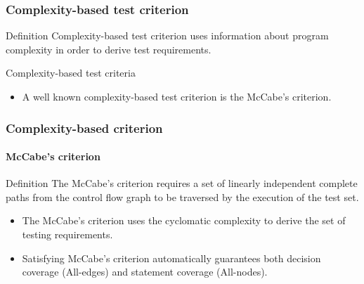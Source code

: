\begin{frame}[parent={cmap:structural-software-testing},hasnext=true,hasprev=true]
\frametitle{Complexity-based test criterion}
\label{concept:complexity-based-test-criterion}

\begin{block:concept}{Definition}
Complexity-based test criterion uses information about program complexity
in order to derive test requirements.
\end{block:concept}

\begin{block:fact}{Complexity-based test criteria}
\begin{itemize}
	\item A well known complexity-based test criterion is the McCabe's
	criterion.
\end{itemize}
\end{block:fact}
\end{frame}


\begin{frame}
\label{concept:mccabe-criterion}
\frametitle{Complexity-based criterion}
\framesubtitle{McCabe's criterion}

\begin{block:concept}{Definition}
The McCabe's criterion requires a set of linearly independent complete paths
from the control flow graph to be traversed by the execution of the test set.
\end{block:concept}

\begin{block:fact}{}
\begin{itemize}
	\item The McCabe's criterion uses the cyclomatic complexity to derive the
	set of testing requirements.

	\item Satisfying McCabe's criterion automatically guarantees both
	decision coverage (All-edges) and statement coverage (All-nodes).
\end{itemize}
\end{block:fact}
\end{frame}



